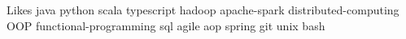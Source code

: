 

\begin{cvskills}

  \cvskill
    {Likes} %
    {java python scala typescript hadoop apache-spark distributed-computing OOP functional-programming sql agile aop spring git unix bash} %


\end{cvskills}

